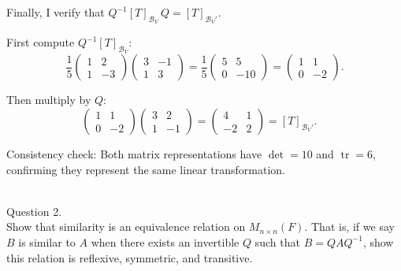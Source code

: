\documentclass{article}
\begin{document}
\begin{mdframed}[linewidth=1pt]
\medskip
\textnormal{Finally, I verify that $Q^{-1}[T]_{\mathcal{B}_V}\, Q = [T]_{\mathcal{B}_V'}$.}

First compute $Q^{-1}[T]_{\mathcal{B}_V}$:
\[
\frac{1}{5}\begin{pmatrix} 1 & 2 \\ 1 & -3 \end{pmatrix}
\begin{pmatrix} 3 & -1 \\ 1 & 3 \end{pmatrix}
= \frac{1}{5}\begin{pmatrix} 5 & 5 \\ 0 & -10 \end{pmatrix}
= \begin{pmatrix} 1 & 1 \\ 0 & -2 \end{pmatrix}.
\]

Then multiply by $Q$:
\[
\begin{pmatrix} 1 & 1 \\ 0 & -2 \end{pmatrix}
\begin{pmatrix} 3 & 2 \\ 1 & -1 \end{pmatrix}
= \begin{pmatrix} 4 & 1 \\ -2 & 2 \end{pmatrix}
= [T]_{\mathcal{B}_V'}. \quad\]

\medskip
\textnormal{Consistency check:} Both matrix representations have $\det = 10$ and $\operatorname{tr} = 6$, confirming they represent the same linear transformation.\end{mdframed}

\bigskip

\newpage


\hfill \break  $~\!\!$ \dotfill \medskip \\
\textnormal{Question 2.}\\
Show that similarity is an equivalence relation on $M_{n \times n}(F)$. That is, if we say $B$ is similar to $A$ when there exists an invertible $Q$ such that $B = QAQ^{-1}$, show this relation is reflexive, symmetric, and transitive.
\end{document}
